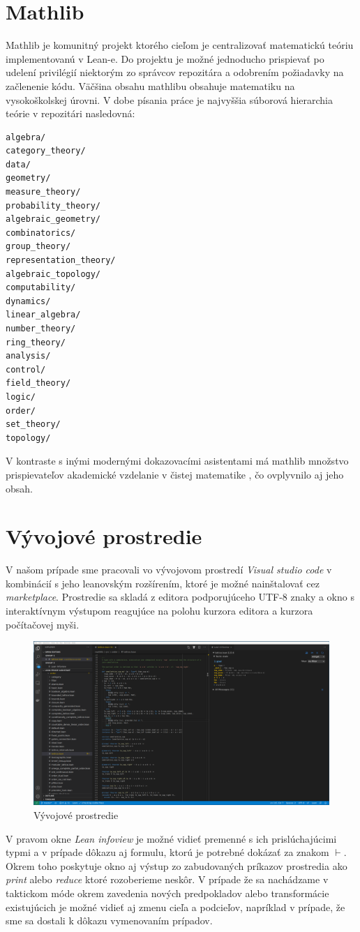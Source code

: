 \documentclass[a4paper,10pt,oneside]{report}%
\begin{document}
\section{Mathlib}
    Mathlib je komunitný projekt \cite{mathlib} ktorého cieľom je centralizovať
matematickú teóriu implementovanú v Lean-e.
    Do projektu je možné jednoducho prispievať po udelení privilégií niektorým zo
správcov repozitára a odobrením požiadavky na začlenenie kódu.
    Väčšina obsahu mathlibu obsahuje matematiku na vysokoškolskej úrovni.
    V dobe písania práce je najvyššia súborová hierarchia teórie v repozitári nasledovná:
\begin{lstlisting}
algebra/
category_theory/
data/
geometry/
measure_theory/
probability_theory/
algebraic_geometry/
combinatorics/
group_theory/
representation_theory/
algebraic_topology/
computability/
dynamics/
linear_algebra/
number_theory/
ring_theory/
analysis/
control/
field_theory/
logic/
order/
set_theory/
topology/
\end{lstlisting}
    V kontraste s inými modernými dokazovacími asistentami má mathlib množstvo
prispievateľov akademické vzdelanie v čistej matematike \cite{mathlib_paper}, čo
ovplyvnilo aj jeho obsah.

\section{Vývojové prostredie}
    V našom prípade sme pracovali vo vývojovom prostredí \emph{Visual studio code}
v kombinácií s jeho leanovským rozšírením, ktoré je možné nainštalovať cez
\emph{marketplace}. Prostredie sa skladá z editora podporujúceho UTF-8 znaky a okno
s interaktívnym výstupom reagujúce na polohu kurzora editora a kurzora počítačovej
myši.
\begin{center}
    \begin{figure}[!ht]
        \centering
        \includegraphics[scale=0.3]{vscode_printscreen.png}
        \caption{Vývojové prostredie}
    \end{figure}
\end{center}
    V pravom okne \emph{Lean infoview} je možné vidieť premenné s ich prislúchajúcimi
typmi a v prípade dôkazu aj formulu, ktorú je potrebné dokázať za znakom $\vdash$.
    Okrem toho poskytuje okno aj výstup zo zabudovaných príkazov prostredia
ako \emph{print} alebo \emph{reduce} ktoré rozoberieme neskôr.
    V prípade že sa nachádzame v taktickom móde okrem zavedenia nových predpokladov
alebo transformácie existujúcich je možné vidieť aj zmenu cieľa a podcieľov,
napríklad v prípade, že sme sa dostali k dôkazu vymenovaním prípadov.
\end{document}
